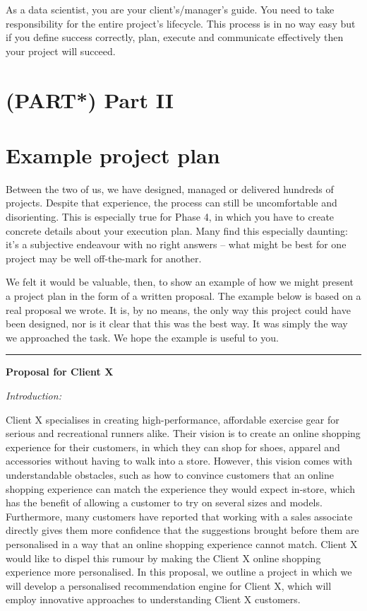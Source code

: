 \documentclass[
]{book}
\begin{document}
As a data scientist, you are your client's/manager's guide. You need to
take responsibility for the entire project's lifecycle. This process is
in no way easy but if you define success correctly, plan, execute and
communicate effectively then your project will succeed.

\hypertarget{part-part-ii}{%
\chapter*{(PART*) Part II}\label{part-part-ii}}

\hypertarget{example}{%
\chapter{Example project plan}\label{example}}

Between the two of us, we have designed, managed or delivered hundreds
of projects. Despite that experience, the process can still be
uncomfortable and disorienting. This is especially true for Phase 4, in
which you have to create concrete details about your execution plan.
Many find this especially daunting: it's a subjective endeavour with no
right answers -- what might be best for one project may be well
off-the-mark for another.

We felt it would be valuable, then, to show an example of how we might
present a project plan in the form of a written proposal. The example
below is based on a real proposal we wrote. It is, by no means, the only
way this project could have been designed, nor is it clear that this was
the best way. It was simply the way we approached the task. We hope the
example is useful to you.

\begin{center}\rule{0.5\linewidth}{0.5pt}\end{center}

\textbf{Proposal for Client X}

\emph{Introduction:}

Client X specialises in creating high-performance, affordable exercise
gear for serious and recreational runners alike. Their vision is to
create an online shopping experience for their customers, in which they
can shop for shoes, apparel and accessories without having to walk into
a store. However, this vision comes with understandable obstacles, such
as how to convince customers that an online shopping experience can
match the experience they would expect in-store, which has the benefit
of allowing a customer to try on several sizes and models. Furthermore,
many customers have reported that working with a sales associate
directly gives them more confidence that the suggestions brought before
them are personalised in a way that an online shopping experience cannot
match. Client X would like to dispel this rumour by making the Client X
online shopping experience more personalised. In this proposal, we
outline a project in which we will develop a personalised recommendation
engine for Client X, which will employ innovative approaches to
understanding Client X customers.
\end{document}
